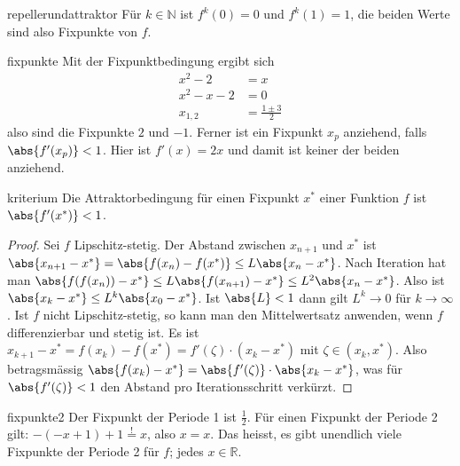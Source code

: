 \documentclass[%
<<<<<<< Updated upstream
11pt,%
twoside,%
titlepage,%
german,%
headsepline%
]{scrartcl}
\begin{document}
\begin{lsg}{repellerundattraktor}
Für $k\in\mathbb{N}$ ist $f^{k}(0)=0$ und $f^{k}(1)=1$, die beiden Werte sind also Fixpunkte von $f$.
\end{lsg}
\begin{lsg}{fixpunkte}
Mit der Fixpunktbedingung ergibt sich
\begin{align*}
x^2-2 &= x\\
x^2-x-2 &= 0\\
x_{1,2} &= \frac{1\pm3}{2}
\end{align*}
also sind die Fixpunkte $2$ und $-1$. Ferner ist ein Fixpunkt $x_p$ anziehend, falls $\abs{f'(x_p)}<1$. Hier ist $f'(x)=2x$ und damit ist keiner der beiden anziehend.
\end{lsg}
\begin{lsg}{kriterium}
Die Attraktorbedingung für einen Fixpunkt $x^*$ einer Funktion $f$ ist $\abs{f'(x^*)}<1$.
\begin{proof}
Sei $f$ Lipschitz-stetig. Der Abstand zwischen $x_{n+1}$ und $x^*$ ist $\abs{x_{n+1}-x^*}=\abs{f(x_n)-f(x^*)}\leq L\abs{x_n-x^*}$. Nach Iteration hat man $\abs{f(f(x_n))-x^*}\leq L\abs{f(x_{n+1})-x^*}\leq L^2\abs{x_n-x^*}$. Also ist $\abs{x_k-x^*}\leq L^k\abs{x_0-x^*}$. Ist $\abs{L}<1$ dann gilt $L^k\to0$ für $k\to\infty$. Ist $f$ nicht Lipschitz-stetig, so kann man den Mittelwertsatz anwenden, wenn $f$ differenzierbar und stetig ist. Es ist $x_{k+1}-x^*=f(x_k)-f(x^*)=f'(\zeta)\cdot(x_k-x^*)$ mit $\zeta\in(x_k,x^*)$. Also betragsmässig $\abs{f(x_k)-x^*} = \abs{f'(\zeta)}\cdot\abs{x_k-x^*}$, was für $\abs{f'(\zeta)}<1$ den Abstand pro Iterationsschritt verkürzt.
\end{proof}
\end{lsg}
\begin{lsg}	{fixpunkte2}
Der Fixpunkt der Periode 1 ist $\frac{1}{2}$. Für einen Fixpunkt der Periode 2 gilt: $-(-x+1)+1\stackrel{!}{=}x$, also $x=x$. Das heisst, es gibt unendlich viele Fixpunkte der Periode 2 für $f$; jedes $x\in\mathbb{R}$.
\end{lsg}
\end{document}
